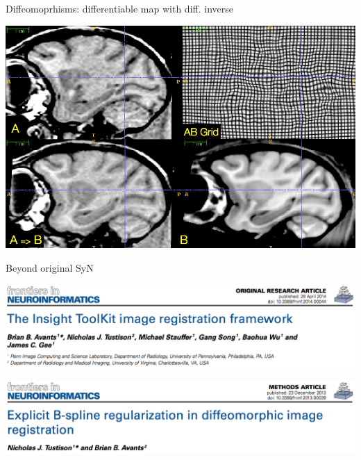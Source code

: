 \documentclass[ignorenonframetext,]{beamer}
\begin{document}
\begin{frame}{Diffeomoprhisms: differentiable map with diff. inverse}

\includegraphics{./figures/highresdiffeos.jpg}

\end{frame}

\begin{frame}{Beyond original SyN}

\small

\includegraphics{./papers/figures/Frontiers_ITK.png}

\includegraphics{./papers/figures/Frontiers_BSplineSyN.png}

\end{frame}
\end{document}
